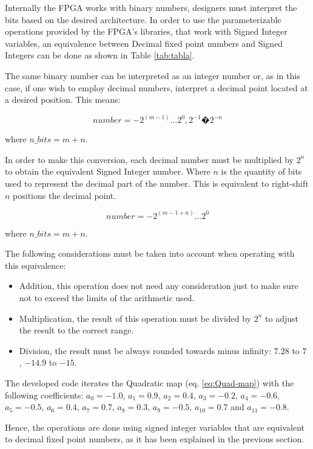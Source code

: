 \documentclass[conference]{IEEEtran}
\begin{document}
Internally the FPGA works with binary numbers, designers must
interpret the bits based on the desired architecture. In order to
use the parameterizable operations provided by the FPGA's
libraries, that work with Signed Integer variables, an equivalence
between Decimal fixed point numbers and Signed Integers can be
done as shown in Table \ref{tab:tabla}.

The same binary number can be interpreted as an integer number or,
as in this case, if one wish to employ decimal numbers, interpret
a decimal point located at a desired position. This means:

\begin{equation}\label{eqdecimal}
number=-2^{(m-1)} ... 2^0,2^{-1}�2^{-n}
\end{equation}

where $n\_bits=m+n$.

In order to make this conversion, each decimal number must be
multiplied by $2^n$ to obtain the equivalent Signed Integer
number. Where $n$ is the quantity of bits used to represent the
decimal part of the number. This is equivalent to right-shift $n$
positions the decimal point.

\begin{equation}\label{eqentero}
 number= -2^{(m-1+n)} ... 2^0
\end{equation}

where $n\_{bits}=m+n$.

The following considerations must be taken into account when operating with this equivalence:

\begin{itemize}
    \item Addition, this operation does not need any consideration just to make sure not to exceed the limits of the arithmetic used.
    \item Multiplication, the result of this operation must be divided by $2^n$ to adjust the result to the correct range.
    \item Division, the result must be always rounded towards minus infinity: $7.28$ to $7$ , $-14.9$ to $-15$.
\end{itemize}


The developed code iterates the Quadratic map (eq.
\ref{eq:Quad-map}) with the following coefficients: \small{
$a_0=-1.0$, $a_1= 0.9$, $a_2= 0.4$, $a_3= -0.2$, $a_4= -0.6$,
$a_5= -0.5$, $a_6= 0.4$, $a_7= 0.7$, $a_8= 0.3$, $a_9=-0.5$,
$a_{10}= 0.7$ and $a_{11}= -0.8$}.


Hence, the operations are done using signed integer variables that
are equivalent to decimal fixed point numbers, as it has been
explained in the previous section.
\end{document}
